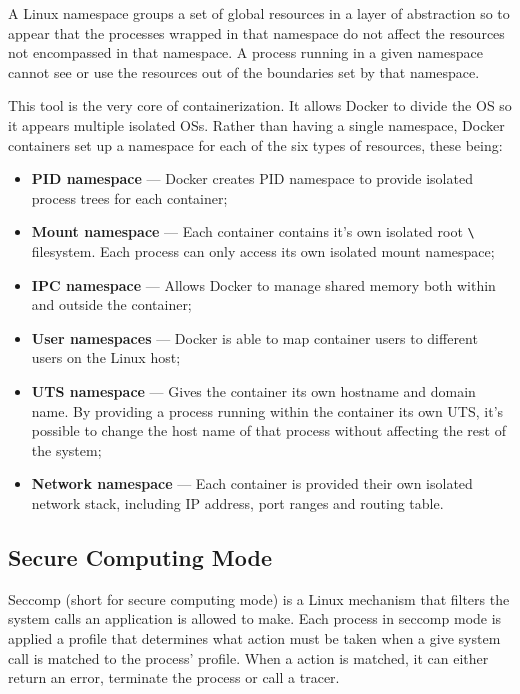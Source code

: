 A Linux namespace groups a set of global resources in a layer of abstraction so to appear that the processes wrapped in that namespace do not affect the resources not encompassed in that namespace. A process running in a given namespace cannot see or use the resources out of the boundaries set by that namespace.

This tool is the very core of containerization. It allows Docker to divide the \ac{OS} so it appears multiple isolated \acp{OS}. Rather than having a single namespace, Docker containers set up a namespace for each of the six types of resources, these being:

\begin{itemize}
    \item \textbf{\ac{PID} namespace} --- Docker creates \ac{PID} namespace to provide isolated process trees for each container;
    \item \textbf{Mount namespace} --- Each container contains it's own isolated root \texttt{\textbackslash} filesystem. Each process can only access its own isolated mount namespace;
    \item \textbf{\ac{IPC} namespace} --- Allows Docker to manage shared memory both within and outside the container;
    \item \textbf{User namespaces} --- Docker is able to map container users to different users on the Linux host;
    \item \textbf{\ac{UTS} namespace} --- Gives the container its own hostname and domain name. By providing a process running within the container its own \ac{UTS}, it's possible to change the host name of that process without affecting the rest of the system;
    \item \textbf{Network namespace} --- Each container is provided their own isolated network stack, including \acs{IP} address, port ranges and routing table.
\end{itemize}


\subsection{Secure Computing Mode}
\label{ssec::security:sec-compt}

Seccomp (short for secure computing mode) is a Linux mechanism that filters the system calls an application is allowed to make. Each process in seccomp mode is applied a profile that determines what action must be taken when a give system call is matched to the process' profile. When a action is matched, it can either return an error, terminate the process or call a tracer.

